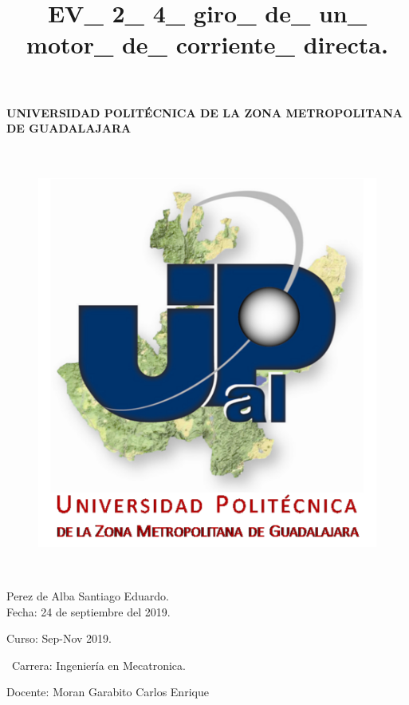 \documentclass[12pt,letterpaper]{article}
\title{EV\_ 2\_ 4\_ giro\_ de\_ un\_ motor\_ de\_ corriente\_ directa.}
\begin{document}
\maketitle




\paragraph{ UNIVERSIDAD POLITÉCNICA DE LA ZONA METROPOLITANA DE GUADALAJARA}

\
\begin{figure}[h!]
\begin{center}

\includegraphics[scale=0.8]{Upzmg.png} 
\label{Upzmg}


\end{center}
\end{figure}


\

\large{Perez de Alba Santiago Eduardo.\\
Fecha: 24 de septiembre del 2019.
\

Curso: Sep-Nov 2019.

\
Carrera: Ingeniería en Mecatronica.\

Docente: Moran Garabito Carlos Enrique}

\newpage
\end{document}
